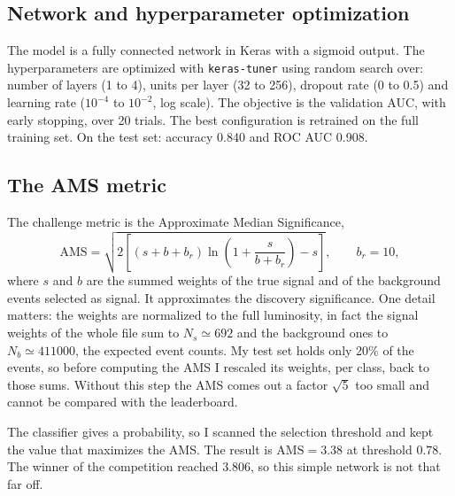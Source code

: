 \documentclass[11pt]{article}
\begin{document}
\subsection*{Network and hyperparameter optimization}

The model is a fully connected network in Keras with a sigmoid output. The hyperparameters are optimized with \texttt{keras-tuner} using random search over: number of layers (1 to 4), units per layer (32 to 256), dropout rate (0 to 0.5) and learning rate ($10^{-4}$ to $10^{-2}$, log scale). The objective is the validation AUC, with early stopping, over 20 trials. The best configuration is retrained on the full training set. On the test set: accuracy 0.840 and ROC AUC 0.908.

\subsection*{The AMS metric}

The challenge metric is the Approximate Median Significance,
\[
\mathrm{AMS} = \sqrt{2\left[(s+b+b_r)\ln\!\left(1+\frac{s}{b+b_r}\right)-s\right]}, \qquad b_r = 10,
\]
where $s$ and $b$ are the summed weights of the true signal and of the background events selected as signal. It approximates the discovery significance. One detail matters: the weights are normalized to the full luminosity, in fact the signal weights of the whole file sum to $N_s \simeq 692$ and the background ones to $N_b \simeq 411000$, the expected event counts. My test set holds only 20\% of the events, so before computing the AMS I rescaled its weights, per class, back to those sums. Without this step the AMS comes out a factor $\sqrt{5}$ too small and cannot be compared with the leaderboard.

The classifier gives a probability, so I scanned the selection threshold and kept the value that maximizes the AMS. The result is $\mathrm{AMS} = 3.38$ at threshold $0.78$. The winner of the competition reached $3.806$, so this simple network is not that far off.
\end{document}
